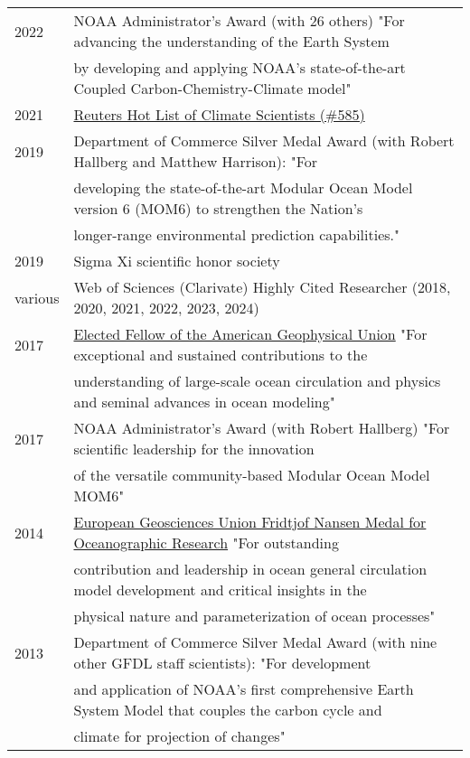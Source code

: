 \documentclass{article}
\begin{document}
\begin{tabular}{ll}
  2022 & NOAA Administrator's Award (with 26 others) "For advancing the understanding of the Earth System \\ & by developing and applying NOAA's state-of-the-art Coupled Carbon-Chemistry-Climate model"
\\
  2021 & \href{https://app.dimensions.ai/details/entities/publication/author/ur.010052126545.52}{Reuters Hot List of Climate Scientists (\#585)} 
  \\
  2019 & Department of Commerce Silver Medal Award (with Robert Hallberg and Matthew Harrison): "For \\ &  developing the state-of-the-art Modular Ocean Model version 6 (MOM6) to strengthen the Nation's \\& longer-range environmental prediction capabilities."
  \\
  2019 & Sigma Xi scientific honor society 
  \\
  various  & Web of Sciences (Clarivate) Highly Cited Researcher (2018, 2020, 2021, 2022, 2023, 2024)
  \\
  2017 & \href{https://eos.org/agu-news/celebrating-the-2017-class-of-fellows}{Elected Fellow of the American Geophysical Union} "For exceptional and sustained contributions to the \\ &  understanding of large-scale ocean circulation and physics and seminal advances in ocean modeling"
\\
  2017 & NOAA Administrator's Award (with Robert Hallberg) "For scientific leadership for the innovation \\ & of the versatile  community-based Modular Ocean Model MOM6" 
  \\
  2014 & \href{http://www.egu.eu/awards-medals/fridtjof-nansen/2014/stephen-m-griffies/}{European Geosciences Union Fridtjof Nansen Medal for
         Oceanographic Research}  "For 
outstanding \\ & contribution and leadership in 
ocean general circulation model development 
and critical insights in the \\ & physical 
nature and parameterization of ocean processes"
\\
  2013 & Department of Commerce Silver Medal Award (with nine other
  GFDL staff scientists): 
  "For development \\ & and application of NOAA's first comprehensive  
  Earth System Model  
  that couples the carbon cycle and \\ & climate for projection of changes" \\

\end{tabular}
\end{document}
